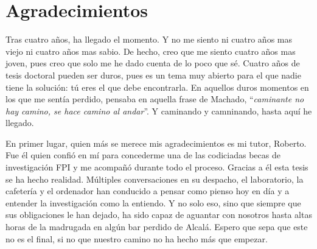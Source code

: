 %
%
%
% 
%
%
%
%

\thispagestyle{empty}

\chapter*{Agradecimientos}
\label{ch:agradecimientos}

Tras cuatro años, ha llegado el momento.
Y no me siento ni cuatro años mas viejo ni cuatro años mas sabio.
De hecho, creo que me siento cuatro años mas joven, pues creo que solo me he dado cuenta de lo poco que sé.
Cuatro años de tesis doctoral pueden ser duros, pues es un tema muy abierto para el que nadie tiene la solución: tú eres el que debe encontrarla.
En aquellos duros momentos en los que me sentía perdido, pensaba en aquella frase de Machado, ``\textit{caminante no hay camino, se hace camino al andar}''.
Y caminando y camninando, hasta aquí he llegado.

En primer lugar, quien más se merece mis agradecimientos es mi tutor, Roberto.
Fue él quien confió en mí para concederme una de las codiciadas becas de investigación FPI y me acompañó durante todo el proceso.
Gracias a él esta tesis se ha hecho realidad.
Múltiples conversaciones en su despacho, el laboratorio, la cafetería y el ordenador han conducido a pensar como pienso hoy en día y a entender la investigación como la entiendo.
Y no solo eso, sino que siempre que sus obligaciones le han dejado, ha sido capaz de aguantar con nosotros hasta altas horas de la madrugada en algún bar perdido de Alcalá.
Espero que sepa que este no es el final, si no que nuestro camino no ha hecho más que empezar.

